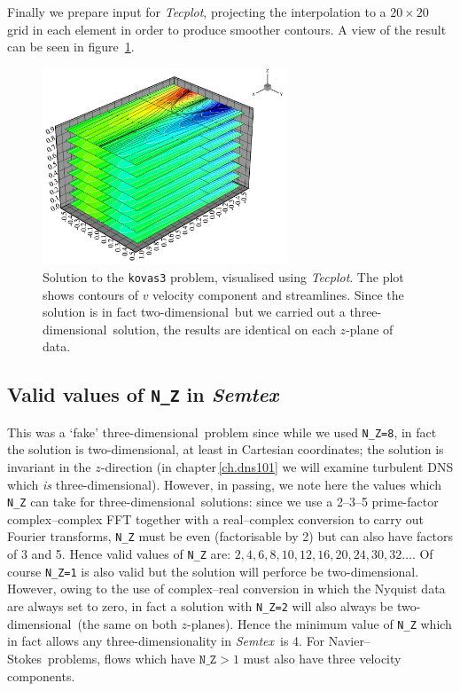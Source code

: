 \documentclass[11pt]{report}
\newcommand{\Semtex}{\emph{Semtex}} \newcommand{\Dog}{\emph{Dog}}
\newcommand{\Tecplot}{\emph{Tecplot}}
\newcommand\twod{two-di\-men\-sion\-al}
\newcommand\threed{three-di\-men\-sion\-al}
\newcommand{\eg}{e.g.\ } \newcommand{\CC}{\mathrm{c.c.}}
\newcommand\NavSto{Navier--Stokes}
\begin{document}
Finally we prepare input for \Tecplot, projecting the
interpolation to a $20\times20$ grid in each element in order to
produce smoother contours.  A view of the result can be seen in
figure~\ref{kov3soln}.
\begin{figure}
\begin{center}
\includegraphics[width=0.65\textwidth]{kovas3_bitmap}
\end{center}
\caption{
\label{kov3soln}
  Solution to the \texttt{kovas3} problem, visualised using \Tecplot.
  The plot shows contours of $v$ velocity component and streamlines.
  Since the solution is in fact \twod\ but we carried out a
  \threed\ solution, the results are identical on each $z$-plane of
  data. }
\end{figure}

\subsection{Valid values of \texttt{N\_Z} in \Semtex}
\label{sec.nz}

This was a `fake' \threed\ problem since while we used \verb|N_Z=8|,
in fact the solution is \twod, at least in Cartesian coordinates; the
solution is invariant in the $z$-direction (in
chapter\,\ref{ch.dns101} we will examine turbulent DNS which \emph{is}
\threed). However, in passing, we note here the values which
\verb|N_Z| can take for \threed\ solutions: since we use a 2--3--5
prime-factor complex--complex FFT \citep{temp92} together with a
real--complex conversion \citep[\eg \S\,12.3,][]{press92} to carry out
Fourier transforms, \verb|N_Z| must be even (factorisable by 2) but
can also have factors of 3 and 5.  Hence valid values of \verb|N_Z|
are: $2, 4, 6, 8, 10, 12, 16, 20, 24, 30, 32 \ldots$.  Of course
\verb|N_Z=1| is also valid but the solution will perforce be \twod.
However, owing to the use of complex--real conversion in which the
Nyquist data are always set to zero, in fact a solution with
\verb|N_Z=2| will also always be \twod\ (the same on both $z$-planes).
Hence the minimum value of \verb|N_Z| which in fact allows any
\threed\-ity in \Semtex\ is 4.  For \NavSto\ problems, flows which
have $\texttt{N\_Z}>1$ must also have three velocity components.
\end{document}
